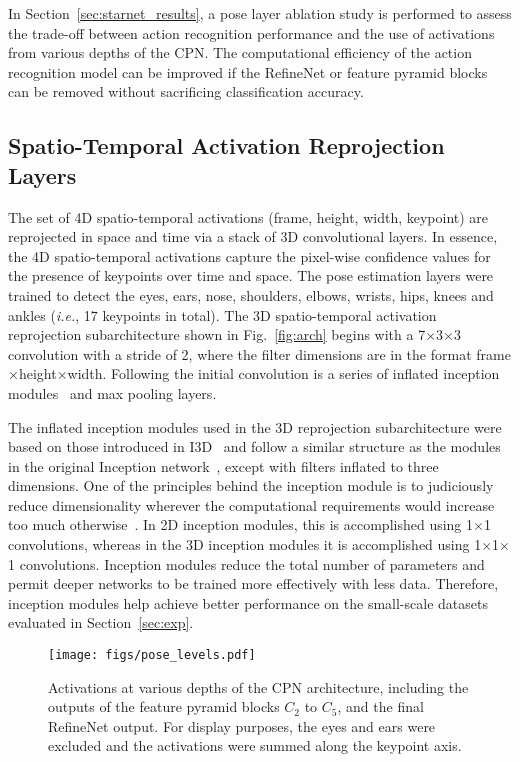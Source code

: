 \documentclass[10pt, conference, compsocconf]{IEEEtran}
\begin{document}
In Section~\ref{sec:starnet_results}, a pose layer ablation study is performed to assess the trade-off between action recognition performance and the use of activations from various depths of the CPN. The computational efficiency of the action recognition model can be improved if the RefineNet or feature pyramid blocks can be removed without sacrificing classification accuracy.

\subsection{Spatio-Temporal Activation Reprojection Layers}

The set of 4D spatio-temporal activations (frame, height, width, keypoint) are reprojected in space and time via a stack of 3D convolutional layers.  In essence, the 4D spatio-temporal activations capture the pixel-wise confidence values for the presence of keypoints over time and space. The pose estimation layers were trained to detect the eyes, ears, nose, shoulders, elbows, wrists, hips, knees and ankles (\textit{i.e.}, 17 keypoints in total).  The 3D spatio-temporal activation reprojection subarchitecture shown in Fig.~\ref{fig:arch} begins with a 7$\times$3$\times$3 convolution with a stride of 2, where the filter dimensions are in the format frame$\times$height$\times$width. Following the initial convolution is a series of inflated inception modules~\cite{carreira2017quo} and max pooling layers. 

The inflated inception modules used in the 3D reprojection subarchitecture were based on those introduced in I3D~\cite{carreira2017quo} and follow a similar structure as the modules in the original Inception network~\cite{szegedy2015going}, except with filters inflated to three dimensions. One of the principles behind the inception module is to judiciously reduce dimensionality wherever the computational requirements would increase too much otherwise~\cite{szegedy2015going}. In 2D inception modules, this is accomplished using 1$\times$1 convolutions, whereas in the 3D inception modules it is accomplished using 1$\times$1$\times$1 convolutions. Inception modules reduce the total number of parameters and permit deeper networks to be trained more effectively with less data. Therefore, inception modules help achieve better performance on the small-scale datasets evaluated in Section~\ref{sec:exp}.

\begin{figure*}[t]
    \vspace{-10pt}
    \centering
    \texttt{[image: figs/pose\_levels.pdf]}
    \vspace{-10pt}
    \caption{Activations at various depths of the CPN architecture, including the outputs of the feature pyramid blocks $C_2$ to $C_5$, and the final RefineNet output. For display purposes, the eyes and ears were excluded and the activations were summed along the keypoint axis.}
    \label{fig:pose_levels}
    \vspace{-15pt}
\end{figure*}
\end{document}
